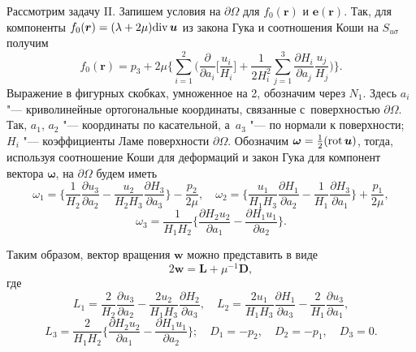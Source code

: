 


Рассмотрим задачу {\sc II}. Запишем условия на $\partial \Omega $ для $f_{0}(\boldsymbol{r})$ и $\boldsymbol{e}(\boldsymbol{r})$.
Так, для компоненты $f_{0}(\boldsymbol r)=(\lambda + 2\mu){\rm div}\, \boldsymbol{u}$ из закона Гука и соотношения Коши
на $S_{u\sigma}$ получим
$$
f_{0}(\boldsymbol{r})=p_{3}+2\mu \biggl\{\sum_{i=1}^{2} \biggl(\frac{\partial}{\partial a_{i}}
\biggl[\frac{u_{i}}{H_{i}}\biggr]
+\frac{1}{2H_{i}^{2}}\sum_{j=1}^{3}
\frac{\partial H_{i}}{\partial a_{j}} \frac{u_{j}}{H_{j}} \biggr)\biggr\}.
$$
Выражение в фигурных скобках, умноженное на 2, обозначим через $N_{1}$. 
Здесь $a_{i}$ "--- криволинейные ортогональные координаты, связанные с~поверхностью $\partial\Omega $. 
Так, $a_{1}$, $a_{2}$ "--- координаты по касательной, а~$a_{3}$ "--- по нормали к поверхности;
$H_{i}$ "--- коэффициенты Ламе поверхности $\partial \Omega$.
Обозначим $\boldsymbol{\omega}=\frac{1}{2}(\mathop{\rm rot}\boldsymbol u)$, тогда, используя
соотношение Коши для деформаций и закон Гука для компонент вектора $\boldsymbol \omega$,
на $\partial\Omega$ будем иметь
$$\omega_{1}=\biggl\{\frac{1}{H_{2}}\frac{\partial u_{3}}{\partial a_{2}}-\frac{u_{2}}
{H_{2}H_{3}}\frac{\partial H_{3}}{\partial a_{3}}\biggr\}-\frac{p_{2}}{2\mu}, \quad
\omega_{2}=\biggl\{\frac{u_{1}}{H_{1}H_{3}}\frac{\partial H_{1}}{\partial a_{2}}-
\frac{1}{H_{1}}\frac{\partial H_{3}}{\partial a_{1}}\biggr\}+\frac{p_{1}}{2\mu},$$
$$\omega_{3}=\frac{1}{H_{1}H_{2}}\biggl\{\frac{\partial H_{2}u_{2}}{\partial a_{1}}-
\frac{\partial H_{1}u_{1}}{\partial a_{2}}\biggr\}.$$

Таким образом, вектор вращения $\boldsymbol w$ можно представить в виде
$$2\boldsymbol{w}=\boldsymbol {L}+\mu^{-1}\boldsymbol{D},$$ где
$$L_{1}=\frac{2}{H_{2}}\frac{\partial u_{3}}{\partial a_{2}}-\frac{2u_{2}}
{H_{1}H_{3}}\frac{\partial H_{2}}{\partial a_{3}}, \quad
L_{2}=\frac{2u_{1}}{H_{1}H_{3}}\frac{\partial H_{1}}{\partial a_{3}}-
\frac{2}{H_{1}}\frac{\partial u_{3}}{\partial a_{1}},$$
$$L_{3}=\frac{2}{H_{1}H_{2}}\biggl\{\frac{\partial H_{2}u_{2}}{\partial a_{1}}-
\frac{\partial H_{1}u_{1}}{\partial a_{2}}\biggr\};\quad 
D_{1}=-p_{2}, \quad  D_{2}=-p_{1}, \quad D_{3}=0.$$

